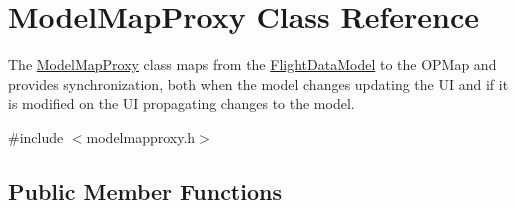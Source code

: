 \hypertarget{class_model_map_proxy}{\section{\-Model\-Map\-Proxy \-Class \-Reference}
\label{class_model_map_proxy}
}


\-The \hyperlink{class_model_map_proxy}{\-Model\-Map\-Proxy} class maps from the \hyperlink{class_flight_data_model}{\-Flight\-Data\-Model} to the \-O\-P\-Map and provides synchronization, both when the model changes updating the \-U\-I and if it is modified on the \-U\-I propagating changes to the model.  




{\ttfamily \#include $<$modelmapproxy.\-h$>$}

\subsection*{\-Public \-Member \-Functions}
